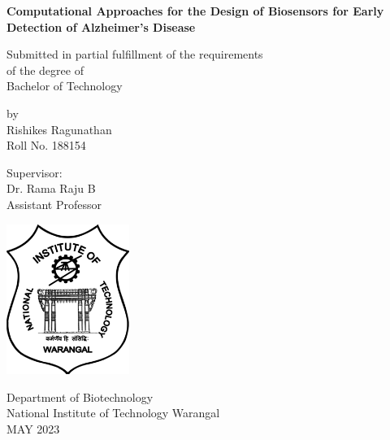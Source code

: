 \begin{center}

    \textbf{\LARGE Computational Approaches for the Design of Biosensors for Early Detection of Alzheimer's Disease}

    \vspace{1cm}

    Submitted in partial fulfillment of the requirements \\
    of the degree of \\
    Bachelor of Technology

    \vspace{1cm}

    by \\
    Rishikes Ragunathan \\
    Roll No. 188154

    \vspace{1cm}

    Supervisor: \\
    Dr. Rama Raju B \\
    Assistant Professor \\

    \vspace{1cm}

    \includegraphics[width=0.3\textwidth]{images/uni_logo.png} %

    \vspace{1cm}

    Department of Biotechnology \\
    National Institute of Technology Warangal \\
    MAY 2023 %

\end{center}

\newpage